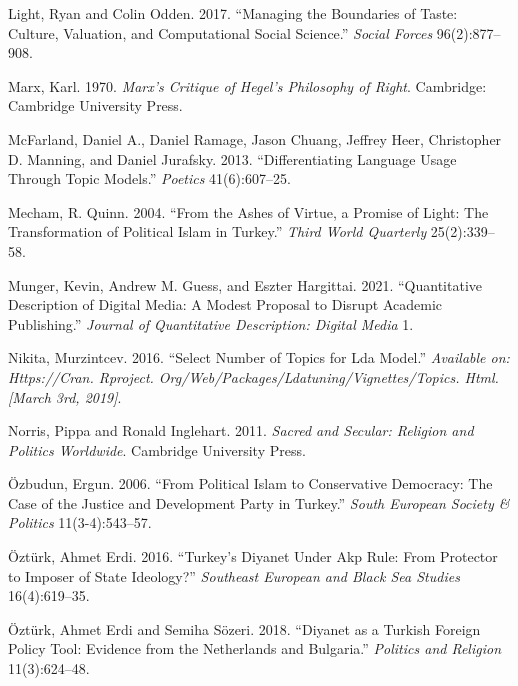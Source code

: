 \documentclass[
  12pt,
]{article}
\begin{document}
\leavevmode\hypertarget{ref-light2017managing}{}%
Light, Ryan and Colin Odden. 2017. ``Managing the Boundaries of Taste: Culture, Valuation, and Computational Social Science.'' \emph{Social Forces} 96(2):877--908.

\leavevmode\hypertarget{ref-marx1970marx}{}%
Marx, Karl. 1970. \emph{Marx's Critique of Hegel's Philosophy of Right}. Cambridge: Cambridge University Press.

\leavevmode\hypertarget{ref-mcfarland2013differentiating}{}%
McFarland, Daniel A., Daniel Ramage, Jason Chuang, Jeffrey Heer, Christopher D. Manning, and Daniel Jurafsky. 2013. ``Differentiating Language Usage Through Topic Models.'' \emph{Poetics} 41(6):607--25.

\leavevmode\hypertarget{ref-mecham2004ashes}{}%
Mecham, R. Quinn. 2004. ``From the Ashes of Virtue, a Promise of Light: The Transformation of Political Islam in Turkey.'' \emph{Third World Quarterly} 25(2):339--58.

\leavevmode\hypertarget{ref-Munger_Guess_Hargittai_2021}{}%
Munger, Kevin, Andrew M. Guess, and Eszter Hargittai. 2021. ``Quantitative Description of Digital Media: A Modest Proposal to Disrupt Academic Publishing.'' \emph{Journal of Quantitative Description: Digital Media} 1.

\leavevmode\hypertarget{ref-nikita2016select}{}%
Nikita, Murzintcev. 2016. ``Select Number of Topics for Lda Model.'' \emph{Available on: Https://Cran. Rproject. Org/Web/Packages/Ldatuning/Vignettes/Topics. Html.{[}March 3rd, 2019{]}}.

\leavevmode\hypertarget{ref-norris2011sacred}{}%
Norris, Pippa and Ronald Inglehart. 2011. \emph{Sacred and Secular: Religion and Politics Worldwide}. Cambridge University Press.

\leavevmode\hypertarget{ref-ozbudun2006political}{}%
Özbudun, Ergun. 2006. ``From Political Islam to Conservative Democracy: The Case of the Justice and Development Party in Turkey.'' \emph{South European Society \& Politics} 11(3-4):543--57.

\leavevmode\hypertarget{ref-Ozt16}{}%
Öztürk, Ahmet Erdi. 2016. ``Turkey's Diyanet Under Akp Rule: From Protector to Imposer of State Ideology?'' \emph{Southeast European and Black Sea Studies} 16(4):619--35.

\leavevmode\hypertarget{ref-uxf6ztuxfcrk_suxf6zeri_2018}{}%
Öztürk, Ahmet Erdi and Semiha Sözeri. 2018. ``Diyanet as a Turkish Foreign Policy Tool: Evidence from the Netherlands and Bulgaria.'' \emph{Politics and Religion} 11(3):624--48.
\end{document}
